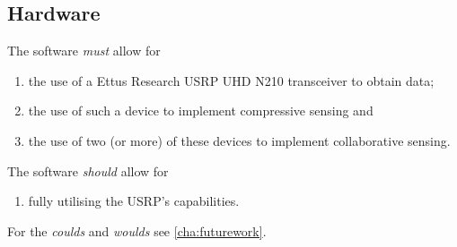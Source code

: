 \documentclass[a4paper, openany, oneside]{memoir}
\begin{document}
\subsection{Hardware}
The software \emph{must} allow for
\begin{enumerate}
    \item the use of a Ettus Research USRP UHD N210 transceiver to obtain data;
    \item the use of such a device to implement compressive sensing and
    \item the use of two (or more) of these devices to implement collaborative sensing.
\end{enumerate}

The software \emph{should} allow for
\begin{enumerate}
    \item fully utilising the USRP's capabilities.
\end{enumerate}

For the \emph{coulds} and \emph{woulds} see \cref{cha:futurework}.
\end{document}
